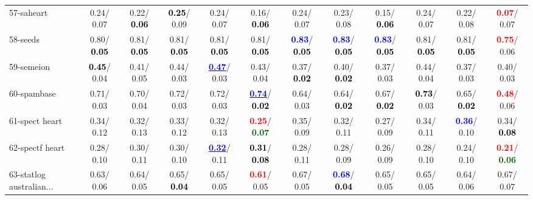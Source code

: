 \begin{table}[h]
\begin{center}
{\begin{tabular}{lc|c|c|c|c|c|c|c|c|c|c}
57-saheart &   0.24/  0.07 &   0.22/\textcolor{black}{\textbf{  0.06}} & \textcolor{black}{\textbf{  0.25}}/  0.09 &   0.24/  0.07 &   0.16/\textcolor{black}{\textbf{  0.06}} &   0.24/  0.07 &   0.23/  0.08 &   0.15/\textcolor{black}{\textbf{  0.06}} &   0.24/  0.07 &   0.22/  0.08 & \textcolor{red}{\textbf{  0.07}}/  0.07 \\
58-seeds &   0.80/\textcolor{black}{\textbf{  0.05}} &   0.81/\textcolor{black}{\textbf{  0.05}} &   0.81/\textcolor{black}{\textbf{  0.05}} &   0.81/\textcolor{black}{\textbf{  0.05}} &   0.81/\textcolor{black}{\textbf{  0.05}} & \textcolor{blue}{\textbf{  0.83}}/\textcolor{black}{\textbf{  0.05}} & \textcolor{blue}{\textbf{  0.83}}/\textcolor{black}{\textbf{  0.05}} & \textcolor{blue}{\textbf{  0.83}}/\textcolor{black}{\textbf{  0.05}} &   0.81/\textcolor{black}{\textbf{  0.05}} &   0.81/\textcolor{black}{\textbf{  0.05}} & \textcolor{red}{\textbf{  0.75}}/  0.06 \\
59-semeion & \textcolor{black}{\textbf{  0.45}}/  0.04 &   0.41/  0.05 &   0.44/  0.03 & \underline{\textcolor{blue}{\textbf{  0.47}}}/  0.03 &   0.43/  0.04 &   0.37/\textcolor{black}{\textbf{  0.02}} &   0.40/\textcolor{black}{\textbf{  0.02}} &   0.37/  0.03 &   0.44/  0.04 &   0.37/  0.03 &   0.40/  0.03 \\
60-spambase &   0.71/  0.03 &   0.70/  0.04 &   0.72/  0.03 &   0.72/  0.03 & \underline{\textcolor{blue}{\textbf{  0.74}}}/\textcolor{black}{\textbf{  0.02}} &   0.64/  0.03 &   0.64/\textcolor{black}{\textbf{  0.02}} &   0.67/\textcolor{black}{\textbf{  0.02}} & \textcolor{black}{\textbf{  0.73}}/  0.03 &   0.65/\textcolor{black}{\textbf{  0.02}} & \textcolor{red}{\textbf{  0.48}}/  0.06 \\ \hline
61-spect heart &   0.34/  0.12 &   0.32/  0.13 &   0.33/  0.12 &   0.32/  0.13 & \textcolor{red}{\textbf{  0.25}}/\textcolor{darkgreen}{\textbf{  0.07}} &   0.35/  0.09 &   0.32/  0.11 &   0.27/  0.09 &   0.34/  0.11 & \textcolor{blue}{\textbf{  0.36}}/  0.10 &   0.34/\textcolor{black}{\textbf{  0.08}} \\
62-spectf heart &   0.28/  0.10 &   0.30/  0.11 &   0.30/  0.10 & \underline{\textcolor{blue}{\textbf{  0.32}}}/  0.11 & \textcolor{black}{\textbf{  0.31}}/\textcolor{black}{\textbf{  0.08}} &   0.28/  0.11 &   0.28/  0.09 &   0.26/  0.09 &   0.28/  0.10 &   0.24/  0.10 & \textcolor{red}{\textbf{  0.21}}/\textcolor{darkgreen}{\textbf{  0.06}} \\
63-statlog australian... &   0.63/  0.06 &   0.64/  0.05 &   0.65/\textcolor{black}{\textbf{  0.04}} &   0.65/  0.05 & \textcolor{red}{\textbf{  0.61}}/  0.05 &   0.67/  0.05 & \textcolor{blue}{\textbf{  0.68}}/\textcolor{black}{\textbf{  0.04}} &   0.65/  0.05 &   0.65/  0.05 &   0.64/  0.06 &   0.67/  0.07 \\

\end{tabular}}
\end{center}
\end{table}
